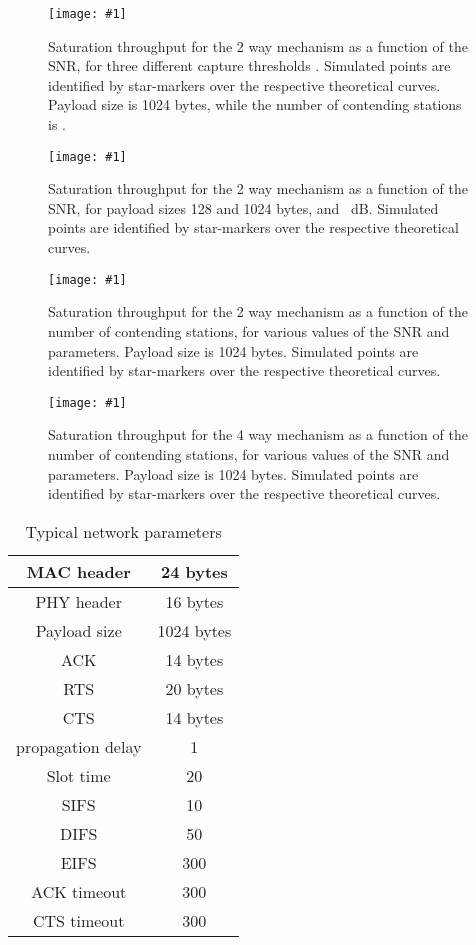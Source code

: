 \documentclass[10pt,onecolumn,a4paper]{IEEEtran}
\newcommand{\figura}[3]
{
\begin{figure}
  \centering
 \texttt{[image: \#1]}
  \caption{#2}\label{#3}
\end{figure}
}
\begin{document}
\figura{2W_1024b_N20.eps}{Saturation throughput for the 2 way
mechanism as a function of the SNR, for three different capture
thresholds . Simulated points are identified by star-markers
over the respective theoretical curves. Payload size is 1024
bytes, while the number of contending stations is
.}{2W_1024b_N20}
\clearpage
\figura{2W_different_payl_sizes.eps}{Saturation throughput for the
2 way mechanism as a function of the SNR, for payload sizes 128
and 1024 bytes, and ~dB. Simulated points are
identified by star-markers over the respective theoretical
curves.}{2W_different_payl_sizes}
\clearpage
\figura{sim2W_1024byte.eps}{Saturation throughput for the 2 way
mechanism as a function of the number of contending stations, for
various values of the SNR and  parameters. Payload size is
1024 bytes. Simulated points are identified by star-markers over
the respective theoretical curves.}{sim2W_1024byte}
\clearpage
\figura{sim4W_1024byte.eps}{Saturation throughput for the 4 way
mechanism as a function of the number of contending stations, for
various values of the SNR and  parameters. Payload size is
1024 bytes. Simulated points are identified by star-markers over
the respective theoretical curves.}{sim4W_1024byte}
\clearpage
\begin{table}\caption{Typical network parameters}\begin{center}
\begin{tabular}{|c|c|}\hline
\hline MAC header & 24 bytes\\
\hline PHY header & 16 bytes\\
\hline Payload size & 1024 bytes\\
\hline ACK & 14 bytes\\
\hline RTS & 20 bytes\\
\hline CTS & 14 bytes\\
\hline
\hline propagation delay  & 1 \\
\hline Slot time & 20 \\
\hline SIFS & 10 \\
\hline DIFS & 50 \\
\hline EIFS & 300 \\

\hline ACK timeout & 300 \\
\hline CTS timeout & 300 \\
\hline\hline
\end{tabular}
 \label{tab.design.times}
\end{center}
\end{table}
\clearpage
\end{document}
